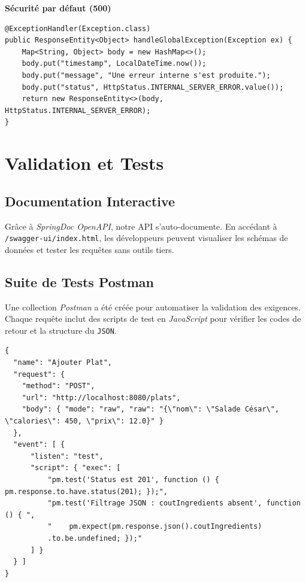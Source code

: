\documentclass[12pt,a4paper,french]{article}
\begin{document}
\vspace{1em}
\textbf{Sécurité par défaut (500)}
\begin{verbatim}
@ExceptionHandler(Exception.class)
public ResponseEntity<Object> handleGlobalException(Exception ex) {
    Map<String, Object> body = new HashMap<>();
    body.put("timestamp", LocalDateTime.now());
    body.put("message", "Une erreur interne s'est produite.");
    body.put("status", HttpStatus.INTERNAL_SERVER_ERROR.value());
    return new ResponseEntity<>(body, HttpStatus.INTERNAL_SERVER_ERROR);
}
\end{verbatim}

\section{Validation et Tests}
\subsection{Documentation Interactive}
Grâce à \textit{SpringDoc OpenAPI}, notre API s'auto-documente. En accédant à \texttt{/swagger-ui/index.html},
les développeurs peuvent visualiser les schémas de données et tester les requêtes sans outils tiers.

\subsection{Suite de Tests Postman}
Une collection \textit{Postman} a été créée pour automatiser la validation des exigences. Chaque requête inclut
des scripts de test en \textit{JavaScript} pour vérifier les codes de retour et la structure du \texttt{JSON}.

\begin{tcolorbox}[projectbox, title=Collection Postman (Extraits)]
    \begin{verbatim}
{
  "name": "Ajouter Plat",
  "request": {
    "method": "POST",
    "url": "http://localhost:8080/plats",
    "body": { "mode": "raw", "raw": "{\"nom\": \"Salade César\", \"calories\": 450, \"prix\": 12.0}" }
  },
  "event": [ {
      "listen": "test",
      "script": { "exec": [
          "pm.test('Status est 201', function () { pm.response.to.have.status(201); });",
          "pm.test('Filtrage JSON : coutIngredients absent', function () { ",
          "    pm.expect(pm.response.json().coutIngredients)
          .to.be.undefined; });"
      ] }
  } ]
}
\end{verbatim}
\end{tcolorbox}
\end{document}
